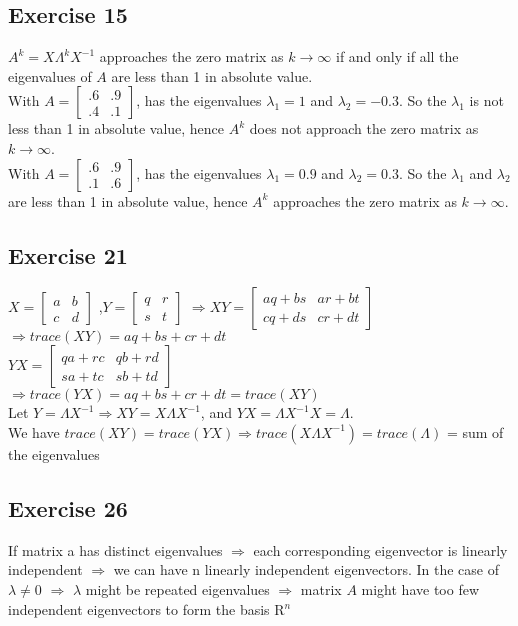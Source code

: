 \documentclass{article}
\begin{document}
\subsection{Exercise 15}
$A^{k} = X{\Lambda}^{k} X^{-1}$ approaches the zero matrix as $k \rightarrow \infty$ if and only if all the eigenvalues of $A$ are less than 1 in absolute value.
\\
With $A =
    \begin{bmatrix}
        .6 & .9 \\
        .4 & .1
    \end{bmatrix}$, has the eigenvalues $\lambda_1 = 1$ and $\lambda_2 = -0.3$. So the $\lambda_1$ is not less than 1 in absolute value, hence $A^{k}$ does not approach the zero matrix as $k \rightarrow \infty$.
\\
With $A =
    \begin{bmatrix}
        .6 & .9 \\
        .1 & .6
    \end{bmatrix}$, has the eigenvalues $\lambda_1 = 0.9$ and $\lambda_2 = 0.3$. So the $\lambda_1$ and $\lambda_2$ are less than 1 in absolute value, hence $A^{k}$ approaches the zero matrix as $k \rightarrow \infty$.

\subsection{Exercise 21}
$X =
\begin{bmatrix}
    a & b \\
    c & d
\end{bmatrix}$
,$Y =
\begin{bmatrix}
    q & r \\
    s & t
\end{bmatrix}$
$\Rightarrow XY =
\begin{bmatrix}
    aq + bs & ar + bt \\
    cq + ds & cr + dt
\end{bmatrix}$
\\
$\Rightarrow trace(XY) = aq + bs + cr + dt$
\\
$YX =
\begin{bmatrix}
    qa + rc & qb + rd \\
    sa + tc & sb + td
\end{bmatrix}$
\\
$\Rightarrow trace(YX) = aq + bs + cr + dt = trace(XY)$
\\
Let $Y = \Lambda X^{-1} \Rightarrow XY  = X \Lambda X^{-1}$,
and $YX = \Lambda X^{-1} X = \Lambda$.
\\
We have $trace(XY) = trace(YX) \Rightarrow trace(X \Lambda X^{-1}) = trace(\Lambda)$ = sum of the eigenvalues

\subsection{Exercise 26}
If matrix a has distinct eigenvalues $\Rightarrow$ each corresponding eigenvector is linearly independent  $\Rightarrow$ we can have n linearly independent eigenvectors.
In the case of $\lambda \neq 0$ $\Rightarrow$ $\lambda$ might be repeated eigenvalues $\Rightarrow$ matrix $A$ might have too few independent eigenvectors to form the basis R$^n$
\end{document}
